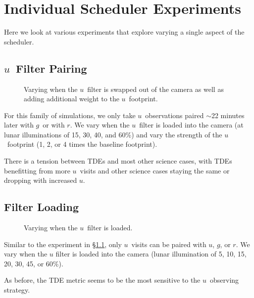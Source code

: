 

\section{Individual Scheduler Experiments}

Here we look at various experiments that explore varying a single aspect of the scheduler. 


\subsection{$u$\ Filter Pairing}\label{ss:ufilt}

\begin{figure}
\caption{Varying when the $u$\ filter is swapped out of the camera as well as adding additional weight to the $u$\ footprint.}
\end{figure}

For this family of simulations, we only take $u$\ observations paired $\sim$22 minutes later with $g$\ or with $r$. We vary when the $u$\ filter is loaded into the camera (at lunar illuminations of 15, 30, 40, and 60\%) and vary the strength of the $u$\ footprint (1, 2, or 4 times the baseline footprint).

There is a tension between TDEs and most other science cases, with TDEs benefitting from more $u$\ visits and other science cases staying the same or dropping with increased $u$.


\subsection{Filter Loading}

\begin{figure}
\caption{Varying when the $u$\ filter is loaded.}
\end{figure}

Similar to the experiment in \S\ref{ss:ufilt}, only $u$\ visits can be paired with $u$, $g$, or $r$. We vary when the $u$ filter is loaded into the camera (lunar illumination of 5, 10, 15, 20, 30, 45, or 60\%). 

As before, the TDE metric seems to be the most sensitive to the $u$\ observing strategy.


